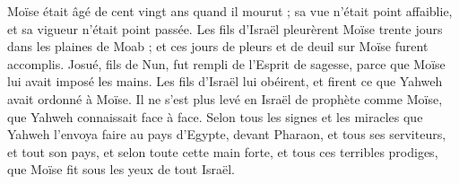 \begin{multicols}{2}
Moïse était âgé de cent vingt ans quand il mourut ; sa vue n'était point affaiblie, et sa vigueur n'était point passée.
Les fils d'Israël pleurèrent Moïse trente jours dans les plaines de Moab ; et ces jours de pleurs et de deuil sur Moïse furent accomplis.
Josué, fils de Nun, fut rempli de l'Esprit de sagesse, parce que Moïse lui avait imposé les mains. Les fils d'Israël lui obéirent, et firent ce que Yahweh avait ordonné à Moïse.
Il ne s'est plus levé en Israël de prophète comme Moïse, que Yahweh connaissait face à face.
Selon tous les signes et les miracles que Yahweh l'envoya faire au pays d'Egypte, devant Pharaon, et tous ses serviteurs, et tout son pays,
et selon toute cette main forte, et tous ces terribles prodiges, que Moïse fit sous les yeux de tout Israël.
\PPE{}
\end{multicols}

